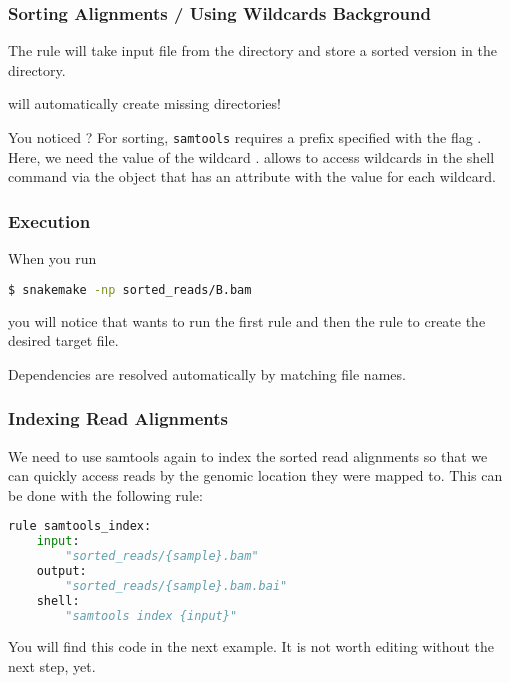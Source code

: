 \begin{frame}[fragile]
  \frametitle{Sorting Alignments / Using Wildcards Background}
  The rule will take  input file from the  directory and store a sorted version in the  directory.
  \pause
  \begin{docs}
  	\Snakemake{} will automatically create missing directories!
  \end{docs}
  You noticed ? 
  \pause
  For sorting, \texttt{samtools} requires a prefix specified with the flag . Here, we need the value of the wildcard . \Snakemake{} allows to access wildcards in the shell command via the  object that has an attribute with the value for each wildcard.
\end{frame}

\begin{frame}[fragile]
  \frametitle{Execution}
  When you run 
  \begin{lstlisting}[language=Bash, style=Shell]
$ snakemake -np sorted_reads/B.bam
  \end{lstlisting}
  you will notice that \Snakemake{} wants to run the first rule  and then the rule  to create the desired target file.
  \begin{docs}
  	Dependencies are resolved automatically by matching file names.
  \end{docs}
\end{frame}

\begin{frame}[fragile]
  \frametitle{Indexing Read Alignments}
  We need to use samtools again to index the sorted read alignments so that we can quickly access reads by the genomic location they were mapped to. This can be done with the following rule:
  \begin{lstlisting}[language=Python,style=Python]
rule samtools_index:
    input:
        "sorted_reads/{sample}.bam"
    output:
        "sorted_reads/{sample}.bam.bai"
    shell:
        "samtools index {input}"
  \end{lstlisting}
  \begin{hint}[Note]
  	You will find this code in the next example. It is not worth editing without the next step, yet.
  \end{hint}
\end{frame}

